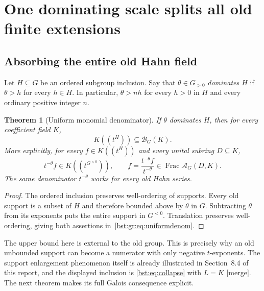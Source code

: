 \documentclass[11pt,letterpaper]{article}
\newtheorem{theorem}{Theorem}[section]
\theoremstyle{definition}
\theoremstyle{remark}
\newcommand{\Frac}{\operatorname{Frac}}
\newcommand{\HH}[2]{#1((t^{#2}))}
\newcommand{\BB}[2]{\mathcal B_{#2}(#1)}
\newcommand{\AAG}[3]{\mathcal A_{#3}(#1,#2)}
\begin{document}
\section{One dominating scale splits all old finite extensions}\label{bst:gr:sec:rankjump}

\subsection{Absorbing the entire old Hahn field}

Let $H\subseteq G$ be an ordered subgroup inclusion. Say that
$\theta\in G_{>0}$ \emph{dominates $H$} if $\theta>h$ for every $h\in H$. In
particular, $\theta>nh$ for every $h>0$ in $H$ and every ordinary positive
integer $n$.

\begin{theorem}[Uniform monomial denominator]\label{bst:gr:thm:absorption}
If $\theta$ dominates $H$, then for every coefficient field $K$,
\[
 \HH KH\subseteq\BB KG.
\]
More explicitly, for every $f\in\HH KH$ and every unital subring $D\subseteq K$,
\begin{equation}\label{bst:gr:eq:uniformdenom}
 t^{-\theta}f\in K((t^{G^{<0}})),\qquad
 f=\frac{t^{-\theta}f}{t^{-\theta}}\in\Frac\AAG DKG.
\end{equation}
The same denominator $t^{-\theta}$ works for every old Hahn series.
\end{theorem}
\begin{proof}
The ordered inclusion preserves well-ordering of supports. Every old support
is a subset of $H$ and therefore bounded above by $\theta$ in $G$.
Subtracting $\theta$ from its exponents puts the entire support in $G^{<0}$.
Translation preserves well-ordering, giving both assertions
in~\eqref{bst:gr:eq:uniformdenom}.
\end{proof}

The upper bound here is external to the old group. This is precisely why an
old unbounded support can become a numerator with only negative
$t$-exponents. The support enlargement phenomenon itself is already
illustrated in Section~8.4 of this report, and the displayed inclusion is
\eqref{bst:eq:collapse} with $L=K$ \textup{[merge]}. The next theorem makes
its full Galois consequence explicit.
\end{document}

